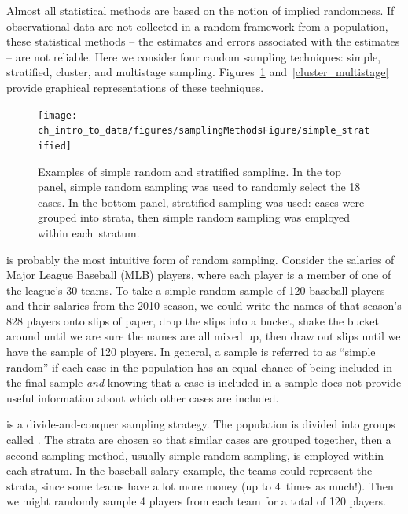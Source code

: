 Almost all statistical methods are based on the notion of implied randomness. If observational data are not collected in a random framework from a population, these statistical methods -- the estimates and errors associated with the estimates -- are not reliable. Here we consider four random sampling techniques: simple, stratified, cluster, and multistage sampling. Figures~\ref{simple_stratified} and~\ref{cluster_multistage} provide graphical representations of these techniques.

\begin{figure}
\centering
\texttt{[image: ch\_intro\_to\_data/figures/samplingMethodsFigure/simple\_stratified]}
\caption{Examples of simple random and stratified sampling. In the top panel, simple random sampling was used to randomly select the 18 cases. In the bottom panel, stratified sampling was used: cases were grouped into strata, then simple random sampling was employed within \mbox{each stratum}.}
\label{simple_stratified}
\end{figure}

 is probably the most intuitive form of random sampling. Consider the salaries of Major League Baseball (MLB) players, where each player is a member of one of the league's 30 teams. To take a simple random sample of 120 baseball players and their salaries from the 2010 season, we could write the names of that season's 828 players onto slips of paper, drop the slips into a bucket, shake the bucket around until we are sure the names are all mixed up, then draw out slips until we have the sample of 120 players. In general, a sample is referred to as ``simple random'' if each case in the population has an equal chance of being included in the final sample \emph{and} knowing that a case is included in a sample does not provide useful information about which other cases are included.

 is a divide-and-conquer sampling strategy. The population is divided into groups called . The strata are chosen so that similar cases are grouped together, then a second sampling method, usually simple random sampling, is employed within each stratum. In the baseball salary example, the teams could represent the strata, since some teams have a lot more money (up to 4~times as much!). Then we might randomly sample 4 players from each team for a total of 120 players.

